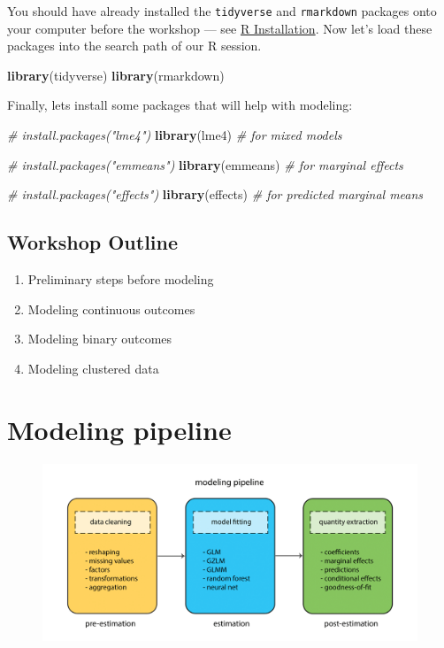 \documentclass[]{book}
\newenvironment{Shaded}{\begin{snugshade}}{\end{snugshade}}
\newcommand{\KeywordTok}[1]{\textcolor[rgb]{0.13,0.29,0.53}{\textbf{#1}}}
\newcommand{\CommentTok}[1]{\textcolor[rgb]{0.56,0.35,0.01}{\textit{#1}}}
\newcommand{\NormalTok}[1]{#1}
\providecommand{\tightlist}{%
  \setlength{\itemsep}{0pt}\setlength{\parskip}{0pt}}
\begin{document}
You should have already installed the \texttt{tidyverse} and
\texttt{rmarkdown} packages onto your computer before the workshop ---
see \href{./Rinstall.html}{R Installation}. Now let's load these
packages into the search path of our R session.

\begin{Shaded}
\begin{Highlighting}[]
\KeywordTok{library}\NormalTok{(tidyverse)}
\KeywordTok{library}\NormalTok{(rmarkdown)}
\end{Highlighting}
\end{Shaded}

Finally, lets install some packages that will help with modeling:

\begin{Shaded}
\begin{Highlighting}[]
\CommentTok{# install.packages("lme4")}
\KeywordTok{library}\NormalTok{(lme4)  }\CommentTok{# for mixed models}

\CommentTok{# install.packages("emmeans")}
\KeywordTok{library}\NormalTok{(emmeans)  }\CommentTok{# for marginal effects}

\CommentTok{# install.packages("effects")}
\KeywordTok{library}\NormalTok{(effects)  }\CommentTok{# for predicted marginal means}
\end{Highlighting}
\end{Shaded}

\subsection{Workshop Outline}\label{workshop-outline}

\begin{enumerate}
\def\labelenumi{\arabic{enumi}.}
\tightlist
\item
  Preliminary steps before modeling
\item
  Modeling continuous outcomes
\item
  Modeling binary outcomes
\item
  Modeling clustered data
\end{enumerate}

\section{Modeling pipeline}\label{modeling-pipeline}

\begin{figure}
\centering
\includegraphics{R/Rmodels/images/R_model_pipeline.png}
\caption{}
\end{figure}
\end{document}
